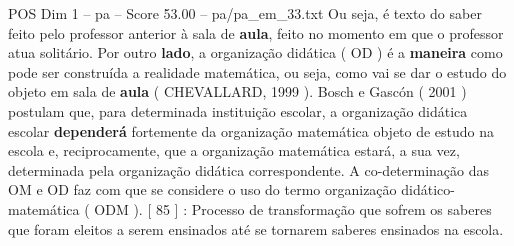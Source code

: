 \begin{textsample}{POS Dim 1 – pa – Score 53.00 – pa/pa\_em\_33.txt}
Ou seja, é texto do saber feito pelo professor anterior à sala de \textbf{aula}, feito no momento em que o professor atua solitário.
Por outro \textbf{lado}, a organização didática ( OD ) é a \textbf{maneira} como pode ser construída a realidade matemática, ou seja, como vai se dar o estudo do objeto em sala de \textbf{aula} ( CHEVALLARD, 1999 ).
Bosch e Gascón ( 2001 ) postulam que, para determinada instituição escolar, a organização didática escolar \textbf{dependerá} fortemente da organização matemática objeto de estudo na escola e, reciprocamente, que a organização matemática estará, a sua vez, determinada pela organização didática correspondente.
A co-determinação das OM e OD faz com que se considere o uso do termo organização didático-matemática ( ODM ). [ 85 ] : Processo de transformação que sofrem os saberes que foram eleitos a serem ensinados até se tornarem saberes ensinados na escola.

\end{textsample}
